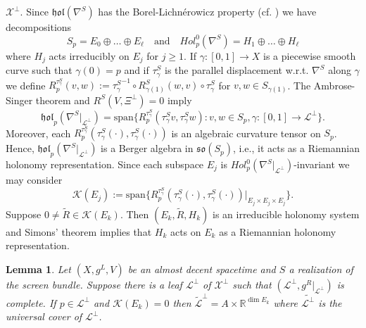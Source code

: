 \documentclass[a4paper,10pt,twoside]{amsart}
\newtheorem{lemma}[theorem]{Lemma}
\theoremstyle{definition}
\theoremstyle{remark}
\numberwithin{equation}{section}
\begin{document}
$\mathcal{X}^{\perp}$. Since ${\mathfrak{{hol}}}(\nabla^{S})$ has the Borel-Lichn\'erowicz property (cf. \cite[Thm. 2.1]{MR2331527}) we have decompositions
\begin{equation*}
	S_{p}= E_{0} \oplus \ldots \oplus E_{\ell} \quad \text{and}
						\quad Hol^{0}_{p}(\nabla^{S}) = H_{1} \oplus \ldots \oplus H_{\ell}
\end{equation*}
where $H_{j}$ acts irreducibly on $E_{j}$ for $j \geq 1$. If $\gamma:[0,1] \rightarrow X$ is a piecewise smooth curve such that $\gamma(0)=p$ and if
$\tau_{\gamma}^{S}$ is the parallel displacement w.r.t. $\nabla^{S}$ along $\gamma$ we define
$R_{p}^{\tau_{\gamma}^{S}}(v,w):= {\tau_{\gamma}^{S}}^{-1} \circ R^{S}_{\gamma(1)}(w,v) \circ \tau_{\gamma}^{S}$ for $v,w \in S_{\gamma(1)}$. The
Ambrose-Singer theorem and $R^{S}(V,\Xi^{\perp})=0$ imply
\begin{equation*}
	{\mathfrak{{hol}}}_{p}(\nabla^{S}|_{\mathcal{L}^{\perp}}) =\mbox{span}\{ R_{p}^{\tau_{\gamma}^{S}}(\tau_{\gamma}^{S}v,\tau_{\gamma}^{S}w): v,w\in S_{p},
									\gamma:[0,1] \rightarrow \mathcal{L}^{\perp} \}.
\end{equation*}
Moreover, each $R_{p}^{\tau_{\gamma}^{S}}(\tau_{\gamma}^{S}(\cdot),\tau_{\gamma}^{S}(\cdot))$ is an algebraic curvature tensor on $S_{p}$. Hence,
${\mathfrak{{hol}}}_{p}(\nabla^{S}|_{\mathcal{L}^{\perp}})$ is a Berger algebra in ${\mathfrak{{so}}}(S_{p})$, i.e., it acts as a Riemannian holonomy
representation. Since each subspace $E_{j}$ is $Hol^{0}_{p}(\nabla^{S}|_{\mathcal{L}^{\perp}})$-invariant we may consider
\begin{equation*}
	\mathcal{K}(E_{j}):=\mbox{span}\{ R_{p}^{\tau_{\gamma}^{S}}(\tau_{\gamma}^{S}(\cdot),\tau_{\gamma}^{S}(\cdot))|_{E_{j}\times E_{j}\times E_{j}}\}.
\end{equation*}
Suppose $0 \neq \tilde{R} \in \mathcal{K}(E_{k})$. Then $(E_{k},\tilde{R},H_{k})$ is an irreducible holonomy system and Simons' theorem \cite{MR0148010}
implies that $H_{k}$ acts on $E_{k}$ as a Riemannian holonomy representation.
\begin{lemma}\label{flat-part-split-off}
	Let $(X,g^{L},V)$ be an almost decent spacetime and $S$ a realization of the screen bundle. Suppose there is a leaf
	$\mathcal{L}^{\perp}$ of $\mathcal{X}^{\perp}$ such that $(\mathcal{L}^{\perp},g^{R}|_{\mathcal{L}^{\perp}})$ is complete.
	If $p \in \mathcal{L}^{\perp}$ and $\mathcal{K}(E_{k})=0$ then $\tilde{\mathcal{L}}^{\perp} = A \times {\mathbb{R}}^{\dim E_{k}}$ where
	$\tilde{\mathcal{L}^{\perp}}$ is the universal cover of $\mathcal{L}^{\perp}$.
\end{lemma}
\end{document}
